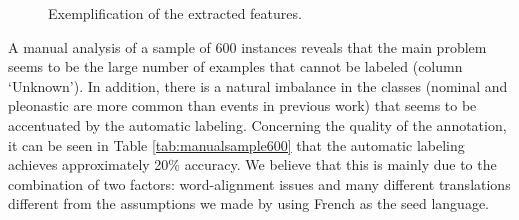 \documentclass[10pt, a4paper]{article} \usepackage{lrec} \usepackage{multibib}
\begin{document}
\begin{center} \begin{figure*}  \caption{Exemplification of the extracted
 features.}\label{fig:featuresexample} 
 \end{figure*} 
 \end{center}


A manual analysis of a sample of 600 instances reveals that the main problem 
seems to be the large number of examples that cannot be labeled (column `Unknown'). 
In addition, there is a natural imbalance in the classes (nominal and pleonastic are more
common than events in previous work) that seems to be accentuated by the
automatic labeling. Concerning the quality of the annotation, it can
be seen in Table \ref{tab:manualsample600} that the automatic labeling achieves
approximately 20\% accuracy. We believe that this is mainly due to the
combination of two factors: word-alignment issues and many different
translations different from the assumptions we made by using French as the seed language.  
\end{document}
